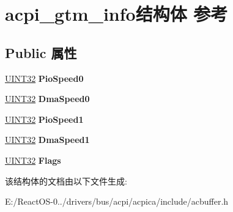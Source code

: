 \hypertarget{structacpi__gtm__info}{}\section{acpi\+\_\+gtm\+\_\+info结构体 参考}
\label{structacpi__gtm__info}
\subsection*{Public 属性}
\begin{DoxyCompactItemize}
\item 
\mbox{\label{structacpi__gtm__info_a128250e3fa062b01e670e0ce84f0b3c3}} 
\hyperlink{_processor_bind_8h_ae1e6edbbc26d6fbc71a90190d0266018}{U\+I\+N\+T32} {\bfseries Pio\+Speed0}
\item 
\mbox{\label{structacpi__gtm__info_a832c495991c24c92e059af8b0d8e3fbe}} 
\hyperlink{_processor_bind_8h_ae1e6edbbc26d6fbc71a90190d0266018}{U\+I\+N\+T32} {\bfseries Dma\+Speed0}
\item 
\mbox{\label{structacpi__gtm__info_a1fab50b22cd784885a52e2e7fd1b0aac}} 
\hyperlink{_processor_bind_8h_ae1e6edbbc26d6fbc71a90190d0266018}{U\+I\+N\+T32} {\bfseries Pio\+Speed1}
\item 
\mbox{\label{structacpi__gtm__info_adbac31239fdec8915bc8990346cc8702}} 
\hyperlink{_processor_bind_8h_ae1e6edbbc26d6fbc71a90190d0266018}{U\+I\+N\+T32} {\bfseries Dma\+Speed1}
\item 
\mbox{\label{structacpi__gtm__info_afb011bb32e6a31aa8e73726d2ed55648}} 
\hyperlink{_processor_bind_8h_ae1e6edbbc26d6fbc71a90190d0266018}{U\+I\+N\+T32} {\bfseries Flags}
\end{DoxyCompactItemize}


该结构体的文档由以下文件生成\+:\begin{DoxyCompactItemize}
\item 
E\+:/\+React\+O\+S-\/0../drivers/bus/acpi/acpica/include/acbuffer.\+h\end{DoxyCompactItemize}
